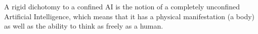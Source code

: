 A rigid dichotomy to a confined AI is the notion of a completely unconfined Artificial Intelligence, which means that it has a physical manifestation (a body) as well as the ability to think as freely as a human.